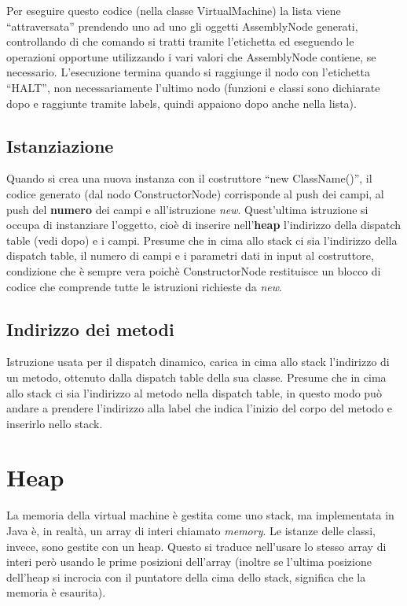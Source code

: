 \documentclass{scrreprt}
\begin{document}
Per eseguire questo codice (nella classe VirtualMachine) la lista viene ``attraversata'' prendendo uno ad uno gli oggetti AssemblyNode generati, controllando di che comando si tratti tramite l'etichetta ed eseguendo le operazioni
opportune utilizzando i vari valori che AssemblyNode contiene, se necessario. L'esecuzione termina quando si raggiunge il nodo con l'etichetta ``HALT'', non necessariamente l'ultimo nodo (funzioni e classi sono dichiarate dopo e raggiunte tramite labels, quindi appaiono dopo anche nella lista).

\subsection{Istanziazione}

Quando si crea una nuova instanza con il costruttore ``new ClassName()'', il codice generato (dal nodo ConstructorNode) corrisponde al push dei campi, al push del \textbf{numero} dei campi e all'istruzione \textit{new}. Quest'ultima 
istruzione si occupa di instanziare l'oggetto, cioè di inserire nell'\textbf{heap} l'indirizzo della dispatch table (vedi dopo) e i campi. Presume che in cima allo stack ci sia l'indirizzo della dispatch table, 
il numero di campi e i parametri dati in input al costruttore, condizione che è sempre vera poichè ConstructorNode restituisce un blocco di codice che comprende tutte le istruzioni richieste da \textit{new}.

\subsection{Indirizzo dei metodi}
Istruzione usata per il dispatch dinamico, carica in cima allo stack l'indirizzo di un metodo, ottenuto dalla
dispatch table della sua classe. Presume che in cima allo stack ci sia l'indirizzo al metodo nella dispatch table, in questo modo può andare a prendere l'indirizzo
alla label che indica l'inizio del corpo del metodo e inserirlo nello stack.

\section{Heap}
La memoria della virtual machine è gestita come uno stack, ma implementata in Java è, in realtà, un array di interi chiamato \textit{memory}. 
Le istanze delle classi, invece, sono gestite con un heap. Questo si traduce nell'usare lo stesso array di interi però usando le prime posizioni dell'array (inoltre se l'ultima posizione dell'heap si incrocia con il puntatore della cima dello stack, significa che la memoria è esaurita).
\end{document}
